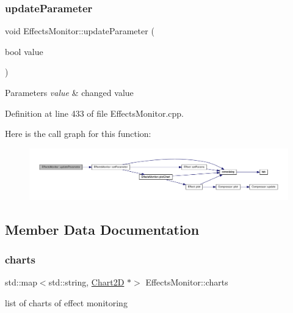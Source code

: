 \subsubsection{\texorpdfstring{update\+Parameter}{updateParameter}\hspace{0.1cm}{\footnotesize\ttfamily [4/4]}}
{\footnotesize\ttfamily void Effects\+Monitor\+::update\+Parameter (\begin{DoxyParamCaption}\item[{bool}]{value }\end{DoxyParamCaption})\hspace{0.3cm}{\ttfamily [slot]}}


\begin{DoxyParams}{Parameters}
{\em value} & changed value \\
\hline
\end{DoxyParams}


Definition at line 433 of file Effects\+Monitor.\+cpp.

Here is the call graph for this function\+:
\nopagebreak
\begin{figure}[H]
\begin{center}
\leavevmode
\includegraphics[width=350pt]{class_effects_monitor_a3488d6ae49a81de79fe6913a7bebcafe_cgraph}
\end{center}
\end{figure}


\subsection{Member Data Documentation}
\mbox{\label{class_effects_monitor_a2b5f5373404adac3f94bdab2f423d958}} 
\subsubsection{\texorpdfstring{charts}{charts}}
{\footnotesize\ttfamily std\+::map$<$std\+::string, \hyperlink{class_chart2_d}{Chart2D} $\ast$$>$ Effects\+Monitor\+::charts}

list of charts of effect monitoring 

